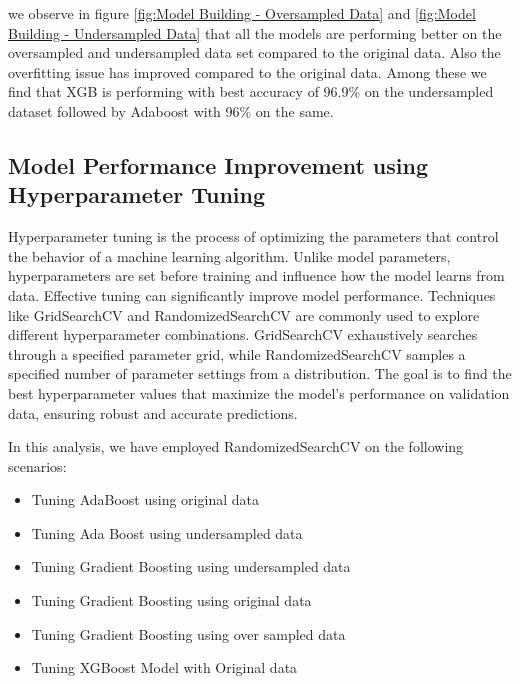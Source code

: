 \documentclass[10pt,a4paper]{style}
\begin{document}
we observe in figure \ref{fig:Model Building - Oversampled Data} and \ref{fig:Model Building - Undersampled Data} that all the models are performing better on the oversampled and undersampled data set compared to the original data. Also the overfitting issue has improved compared to the original data. Among these we find that XGB is performing with best accuracy of  96.9\% on the undersampled dataset followed by Adaboost with 96\% on the same. 
\subsection{Model Performance Improvement using Hyperparameter Tuning}	
Hyperparameter tuning is the process of optimizing the parameters that control the behavior of a machine learning algorithm. Unlike model parameters, hyperparameters are set before training and influence how the model learns from data. Effective tuning can significantly improve model performance. Techniques like GridSearchCV and RandomizedSearchCV are commonly used to explore different hyperparameter combinations. GridSearchCV exhaustively searches through a specified parameter grid, while RandomizedSearchCV samples a specified number of parameter settings from a distribution. The goal is to find the best hyperparameter values that maximize the model's performance on validation data, ensuring robust and accurate predictions.

In this analysis, we have employed RandomizedSearchCV on the following scenarios:
\begin{multicols}{2}
\begin{itemize}
	\setlength\itemsep{-5pt}
	\item Tuning AdaBoost using original data
	\item Tuning Ada Boost using undersampled data
	\item Tuning Gradient Boosting using undersampled data
\end{itemize}
\columnbreak
\begin{itemize}
	\setlength\itemsep{-5pt}
	\item Tuning Gradient Boosting using original data
	\item Tuning Gradient Boosting using over sampled data
	\item Tuning XGBoost Model with Original data
\end{itemize}
\end{multicols}
\end{document}

